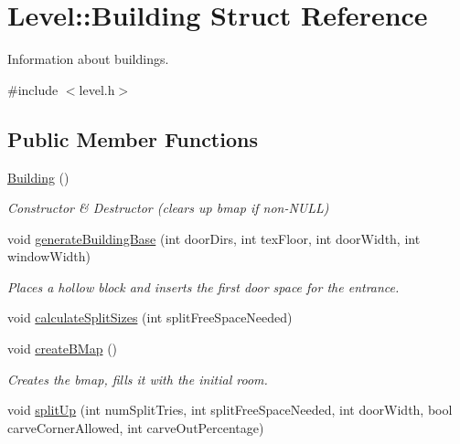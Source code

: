 \hypertarget{structLevel_1_1Building}{
\section{\-Level\-:\-:\-Building \-Struct \-Reference}
\label{db/da2/structLevel_1_1Building}
}


\-Information about buildings.  




{\ttfamily \#include $<$level.\-h$>$}

\subsection*{\-Public \-Member \-Functions}
\begin{DoxyCompactItemize}
\item 
\hypertarget{structLevel_1_1Building_ad97691b46f6ed26a9b0481210d1f086c}{
\hyperlink{structLevel_1_1Building_ad97691b46f6ed26a9b0481210d1f086c}{\-Building} ()}
\label{db/da2/structLevel_1_1Building_ad97691b46f6ed26a9b0481210d1f086c}

\begin{DoxyCompactList}\small\item\em \-Constructor \& \-Destructor (clears up bmap if non-\/\-N\-U\-L\-L) \end{DoxyCompactList}\item 
\hypertarget{structLevel_1_1Building_a9e4afff8f83b146347eb6d99f8401b38}{
void \hyperlink{structLevel_1_1Building_a9e4afff8f83b146347eb6d99f8401b38}{generate\-Building\-Base} (int door\-Dirs, int tex\-Floor, int door\-Width, int window\-Width)}
\label{db/da2/structLevel_1_1Building_a9e4afff8f83b146347eb6d99f8401b38}

\begin{DoxyCompactList}\small\item\em \-Places a hollow block and inserts the first door space for the entrance. \end{DoxyCompactList}\item 
void \hyperlink{structLevel_1_1Building_ac893ad0cee7261ef8aab9000c8510bea}{calculate\-Split\-Sizes} (int split\-Free\-Space\-Needed)
\item 
\hypertarget{structLevel_1_1Building_ab508a1d117de524ccc7185fa4327988e}{
void \hyperlink{structLevel_1_1Building_ab508a1d117de524ccc7185fa4327988e}{create\-B\-Map} ()}
\label{db/da2/structLevel_1_1Building_ab508a1d117de524ccc7185fa4327988e}

\begin{DoxyCompactList}\small\item\em \-Creates the bmap, fills it with the initial room. \end{DoxyCompactList}\item 
\hypertarget{structLevel_1_1Building_a0d0d3e166434975a106cabdabf995f2d}{
void \hyperlink{structLevel_1_1Building_a0d0d3e166434975a106cabdabf995f2d}{split\-Up} (int num\-Split\-Tries, int split\-Free\-Space\-Needed, int door\-Width, bool carve\-Corner\-Allowed, int carve\-Out\-Percentage)}
\label{db/da2/structLevel_1_1Building_a0d0d3e166434975a106cabdabf995f2d}


\end{DoxyCompactItemize}
